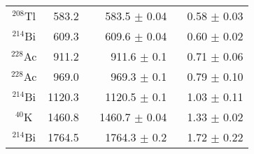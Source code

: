 \begin{table}
\begin{tabular}{  c  r  r  c  }
					$^{208}$Tl     & 583.2     ~ & 583.5      ${\pm}$ 0.04       ~ & 0.58       ${\pm}$ 0.03       \\
					$^{214}$Bi     & 609.3     ~ & 609.6      ${\pm}$ 0.04       ~ & 0.60       ${\pm}$ 0.02       \\
					$^{228}$Ac     & 911.2     ~ & 911.6      ${\pm}$ 0.1       ~ & 0.71       ${\pm}$ 0.06       \\
					$^{228}$Ac     & 969.0     ~ & 969.3      ${\pm}$ 0.1       ~ & 0.79       ${\pm}$ 0.10       \\
					$^{214}$Bi     & 1120.3    ~ & 1120.5     ${\pm}$ 0.1       ~ & 1.03       ${\pm}$ 0.11       \\
					$^{40}$K       & 1460.8    ~ & 1460.7     ${\pm}$ 0.04       ~ & 1.33       ${\pm}$ 0.02       \\
					$^{214}$Bi     & 1764.5    ~ & 1764.3     ${\pm}$ 0.2       ~ & 1.72       ${\pm}$ 0.22       \\

\end{tabular}
\end{table}
